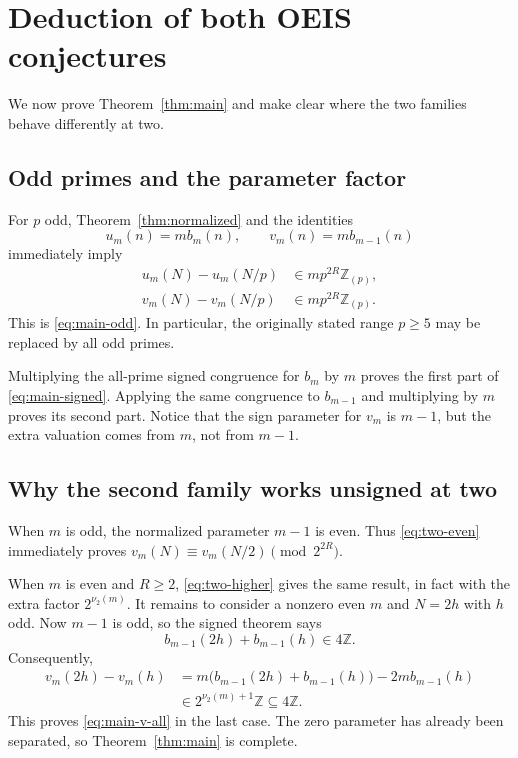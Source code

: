 \documentclass[11pt,letterpaper]{article}
\numberwithin{equation}{section}
\theoremstyle{definition}
\newcommand{\Z}{\mathbb Z}
\newcommand{\Zp}{\Z_{(p)}}
\begin{document}
\section{Deduction of both OEIS conjectures}\label{sec:deduction}

We now prove Theorem~\ref{thm:main} and make clear where the two families
behave differently at two.

\subsection{Odd primes and the parameter factor}

For $p$ odd, Theorem~\ref{thm:normalized} and the identities
\[
u_m(n)=m b_m(n),\qquad v_m(n)=m b_{m-1}(n)
\]
immediately imply
\[
\begin{split}
u_m(N)-u_m(N/p)&\in m p^{2R}\Zp,\\
v_m(N)-v_m(N/p)&\in m p^{2R}\Zp.
\end{split}
\]
This is \eqref{eq:main-odd}. In particular, the originally stated range
$p\geq5$ may be replaced by all odd primes.

Multiplying the all-prime signed congruence for $b_m$ by $m$ proves the
first part of \eqref{eq:main-signed}. Applying the same congruence to
$b_{m-1}$ and multiplying by $m$ proves its second part. Notice that the
sign parameter for $v_m$ is $m-1$, but the extra valuation comes from
$m$, not from $m-1$.

\subsection{Why the second family works unsigned at two}

When $m$ is odd, the normalized parameter $m-1$ is even. Thus
\eqref{eq:two-even} immediately proves
$v_m(N)\equiv v_m(N/2)\pmod{2^{2R}}$.

When $m$ is even and $R\geq2$, \eqref{eq:two-higher} gives the same
result, in fact with the extra factor $2^{\nu_2(m)}$.
It remains to consider a nonzero even $m$ and $N=2h$ with $h$ odd.
Now $m-1$ is odd, so the signed theorem says
\[
b_{m-1}(2h)+b_{m-1}(h)\in4\Z.
\]
Consequently,
\begin{equation}\label{eq:V2-boundary}
\begin{aligned}
v_m(2h)-v_m(h)
&=m\bigl(b_{m-1}(2h)+b_{m-1}(h)\bigr)
  -2m b_{m-1}(h)\\
&\in2^{\nu_2(m)+1}\Z\subseteq4\Z.
\end{aligned}
\end{equation}
This proves \eqref{eq:main-v-all} in the last case. The zero parameter
has already been separated, so Theorem~\ref{thm:main} is complete.
\end{document}
